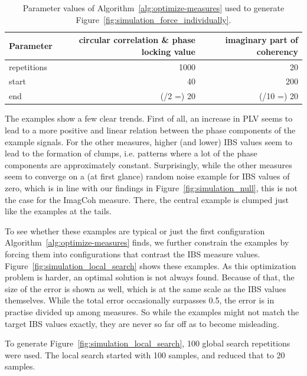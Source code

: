 \begin{table}[!htbp]
  \caption{Parameter values of Algorithm~\ref{alg:optimize-measures} used to generate Figure~\ref{fig:simulation_force_individually}.}
  \label{tab:force_individually_params}
  \begin{tabular}{l r r}
    \hline
    Parameter   & circular correlation \& phase locking value & imaginary part of coherency\\\hline
    repetitions &      1000 &          20\\
    start       &        40 &         200\\
    end         & (/2 =) 20 &  (/10 =) 20\\\hline
  \end{tabular}
\end{table}

The examples show a few clear trends. First of all, an increase in PLV seems to
lead to a more positive and linear relation between the phase components of the
example signals. For the other measures, higher (and lower) IBS values seem
to lead to the formation of clumps, i.e. patterns where a lot of the phase
components are approximately constant. Surprisingly, while the other measures
seem to converge on a (at first glance) random noise example for IBS values
of zero, which is in line with our findings in Figure~\ref{fig:simulation_null},
this is not the case for the ImagCoh measure. There, the
central example is clumped just like the examples at the tails.

To see whether these examples are typical or just the first configuration
Algorithm~\ref{alg:optimize-measures} finds, we further constrain the examples
by forcing them into configurations that contrast the IBS measure values.
Figure~\ref{fig:simulation_local_search} shows these examples. As this
optimization problem is harder, an optimal solution is not always found. Because
of that, the size of the error is shown as well, which is at the same scale as
the IBS values themselves. While the total error occasionally surpasses
0.5, the error is in practise divided up among measures. So while the examples
might not match the target IBS values exactly, they are never so far off as
to become misleading.

To generate Figure~\ref{fig:simulation_local_search}, 100 global search
repetitions were used. The local search started with 100 samples, and reduced
that to 20 samples.


